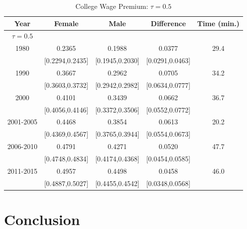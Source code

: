\documentclass[beamer, t]{beamer}
\begin{document}
\begin{frame}
	
	\begin{table}[htb]
		\centering
		\footnotesize
		\caption{College Wage Premium: $\tau=0.5$}\label{tb:median_5yr_full}
		\begin{tabular}{ccccc}
			\hline
			Year & Female & Male & Difference & Time (min.) \\ 
			\hline
			\underline{$\tau = 0.5$}\\
			1980 & 0.2365 & 0.1988 & 0.0377 & 29.4 \\ 
			& [0.2294,0.2435] & [0.1945,0.2030] & [0.0291,0.0463] &  \\ 
			1990 & 0.3667 & 0.2962 & 0.0705 & 34.2 \\ 
			& [0.3603,0.3732] & [0.2942,0.2982] & [0.0634,0.0777] &  \\ 
			2000 & 0.4101 & 0.3439 & 0.0662 & 36.7 \\ 
			& [0.4056,0.4146] & [0.3372,0.3506] & [0.0552,0.0772] &  \\ 
			2001-2005 & 0.4468 & 0.3854 & 0.0613 & 20.2 \\ 
			& [0.4369,0.4567] & [0.3765,0.3944] & [0.0554,0.0673] &  \\ 
			2006-2010 & 0.4791 & 0.4271 & 0.0520 & 47.7 \\ 
			& [0.4748,0.4834] & [0.4174,0.4368] & [0.0454,0.0585] &  \\ 
			2011-2015 & 0.4957 & 0.4498 & 0.0458 & 46.0 \\ 
			& [0.4887,0.5027] & [0.4455,0.4542] & [0.0348,0.0568] &  \\ 
			\hline
		\end{tabular}

	\end{table}
	
	
\end{frame}

\section{Conclusion}
\end{document}
